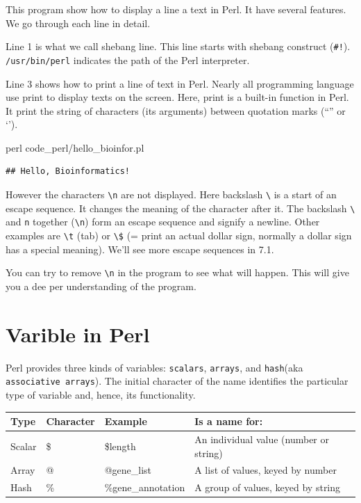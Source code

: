\documentclass[]{book}
\makeatletter
\newenvironment{Shaded}{\begin{snugshade}}{\end{snugshade}}
\newcommand{\FunctionTok}[1]{\textcolor[rgb]{0.00,0.00,0.00}{#1}}
\newcommand{\NormalTok}[1]{#1}
\newenvironment{kframe}{%
\medskip{}
\setlength{\fboxsep}{.8em}
 \def\at@end@of@kframe{}%
 \ifinner\ifhmode%
  \def\at@end@of@kframe{\end{minipage}}%
  \begin{minipage}{\columnwidth}%
 \fi\fi%
 \def\FrameCommand##1{\hskip\@totalleftmargin \hskip-\fboxsep
 \colorbox{shadecolor}{##1}\hskip-\fboxsep
     \hskip-\linewidth \hskip-\@totalleftmargin \hskip\columnwidth}%
 \MakeFramed {\advance\hsize-\width
   \@totalleftmargin\z@ \linewidth\hsize
   \@setminipage}}%
 {\par\unskip\endMakeFramed%
 \at@end@of@kframe}
\renewenvironment{Shaded}{\begin{kframe}}{\end{kframe}}
\makeatother
\begin{document}
This program show how to display a line a text in Perl. It have several features. We go through each line in detail.

Line 1 is what we call shebang line. This line starts with shebang construct (\texttt{\#!}). \texttt{/usr/bin/perl} indicates the path of the Perl interpreter.

Line 3 shows how to print a line of text in Perl. Nearly all programming language use print to display texts on the screen. Here, print is a built-in function in Perl. It print the string of characters (its arguments) between quotation marks (``'' or `').

\begin{Shaded}
\begin{Highlighting}[]
\FunctionTok{perl}\NormalTok{ code_perl/hello_bioinfor.pl}
\end{Highlighting}
\end{Shaded}

\begin{verbatim}
## Hello, Bioinformatics!
\end{verbatim}

However the characters \texttt{\textbackslash{}n} are not displayed. Here backslash \texttt{\textbackslash{}} is a start of an escape sequence. It changes the meaning of the character after it. The backslash \texttt{\textbackslash{}} and \texttt{n} together (\texttt{\textbackslash{}n}) form an escape sequence and signify a newline. Other examples are \texttt{\textbackslash{}t} (tab) or \texttt{\textbackslash{}\$} (= print an actual dollar sign, normally a dollar sign has a special meaning). We'll see more escape sequences in 7.1.

You can try to remove \texttt{\textbackslash{}n} in the program to see what will happen. This will give you a dee per understanding of the program.

\hypertarget{varible-in-perl}{%
\chapter{Varible in Perl}\label{varible-in-perl}}

Perl provides three kinds of variables: \texttt{scalars}, \texttt{arrays}, and \texttt{hash}(aka \texttt{associative\ arrays}). The initial character of the name identifies the particular type of variable and, hence, its functionality.

\begin{longtable}[]{@{}llll@{}}
\toprule
Type & Character & Example & Is a name for:\tabularnewline
\midrule
\endhead
Scalar & \$ & \$length & An individual value (number or string)\tabularnewline
Array & @ & @gene\_list & A list of values, keyed by number\tabularnewline
Hash & \% & \%gene\_annotation & A group of values, keyed by string\tabularnewline
\bottomrule
\end{longtable}
\end{document}
